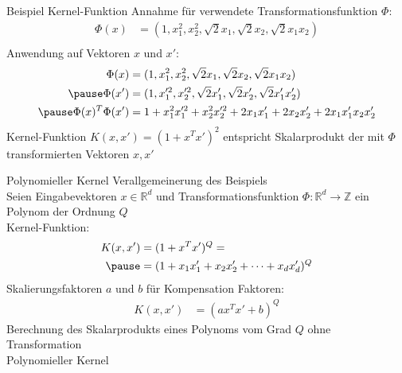 \documentclass[ngerman]{beamer}
\begin{document}
\begin{frame}{Beispiel Kernel-Funktion}
    Annahme für verwendete Transformationsfunktion $\Phi$: \\
    \begin{equation*}
        \begin{aligned}
            \Phi(x) &= (1, x_{1}^{2}, x_{2}^{2}, \sqrt{2} x_{1}, \sqrt{2} x_{2}, \sqrt{2} x_{1} x_{2})\\
        \end{aligned}
    \end{equation*}
    Anwendung auf Vektoren $x$ und $x'$: \\ \pause
    \begin{equation*} \label{eq:example1_innerprod_pres}
    \begin{aligned}
        \Phi(x) &= (1, x_{1}^{2}, x_{2}^{2}, \sqrt{2} x_{1}, \sqrt{2} x_{2}, \sqrt{2} x_{1} x_{2})\\ \pause
        \Phi(x') &= (1, x_{1}'^{2}, x_{2}'^{2}, \sqrt{2} x_{1}', \sqrt{2} x_{2}', \sqrt{2} x_{1}' x_{2}')\\ \pause
        \Phi(x)^T \Phi(x') &= 1 + x_{1}^2 x_{1}'^2 + x_{2}^{2} x_{2}'^{2} + 2x_{1} x_{1}' + 2 x_{2} x_{2}' + 2 x_{1} x_{1}'x_{2} x_{2}'
    \end{aligned}
    \end{equation*} \pause
    Kernel-Funktion $K(x, x') = (1 + x^{T}x')^{2}$ entspricht Skalarprodukt der mit $\Phi$ transformierten Vektoren $x, x'$
\end{frame}

\begin{frame}{Polynomieller Kernel}
    Verallgemeinerung des Beispiels \\
    Seien Eingabevektoren $x \in \mathbb{R}^d$ und Transformationsfunktion $\Phi: \mathbb{R}^d \rightarrow \mathbb{Z}$ ein Polynom der Ordnung $Q$ \\
    Kernel-Funktion: \\
    \begin{equation*} \label{eq:poly_kernel_pres}
    \begin{aligned}
        K(x, x') &= (1 + x^{T}x')^{Q} = \\ \pause
        &= (1 + x_{1} x_{1}' + x_{2} x_{2}' + \dots + x_{d} x_{d}')^{Q}
    \end{aligned}
    \end{equation*} \pause
    Skalierungsfaktoren $a$ und $b$ für Kompensation Faktoren: \\
    \begin{equation*} \label{eq:poly_kernel2_pres}
    \begin{aligned}
        K(x, x') &= (a x^{T}x' + b)^{Q}
    \end{aligned}
    \end{equation*} \pause
    Berechnung des Skalarprodukts eines Polynoms vom Grad $Q$ ohne Transformation \\ \pause
    Polynomieller Kernel
\end{frame}
\end{document}
